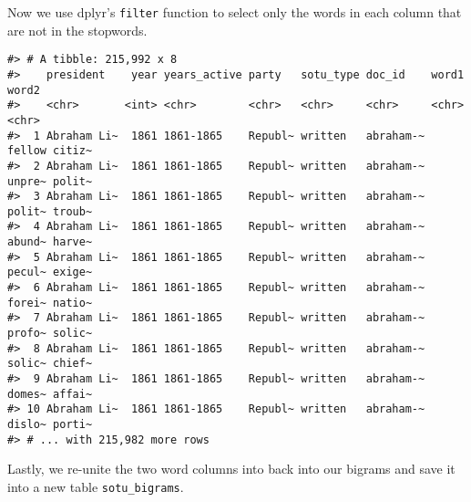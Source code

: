 \documentclass[]{book}
\newenvironment{Shaded}{\begin{snugshade}}{\end{snugshade}}
\newcommand{\CommentTok}[1]{\textcolor[rgb]{0.56,0.35,0.01}{\textit{#1}}}
\newcommand{\DataTypeTok}[1]{\textcolor[rgb]{0.13,0.29,0.53}{#1}}
\newcommand{\DecValTok}[1]{\textcolor[rgb]{0.00,0.00,0.81}{#1}}
\newcommand{\KeywordTok}[1]{\textcolor[rgb]{0.13,0.29,0.53}{\textbf{#1}}}
\newcommand{\NormalTok}[1]{#1}
\newcommand{\OperatorTok}[1]{\textcolor[rgb]{0.81,0.36,0.00}{\textbf{#1}}}
\newcommand{\StringTok}[1]{\textcolor[rgb]{0.31,0.60,0.02}{#1}}
\begin{document}
Now we use dplyr's \texttt{filter} function to select only the words in each column that are not in the stopwords.

\begin{Shaded}
\end{Shaded}

\begin{verbatim}
#> # A tibble: 215,992 x 8
#>    president    year years_active party   sotu_type doc_id    word1  word2 
#>    <chr>       <int> <chr>        <chr>   <chr>     <chr>     <chr>  <chr> 
#>  1 Abraham Li~  1861 1861-1865    Republ~ written   abraham-~ fellow citiz~
#>  2 Abraham Li~  1861 1861-1865    Republ~ written   abraham-~ unpre~ polit~
#>  3 Abraham Li~  1861 1861-1865    Republ~ written   abraham-~ polit~ troub~
#>  4 Abraham Li~  1861 1861-1865    Republ~ written   abraham-~ abund~ harve~
#>  5 Abraham Li~  1861 1861-1865    Republ~ written   abraham-~ pecul~ exige~
#>  6 Abraham Li~  1861 1861-1865    Republ~ written   abraham-~ forei~ natio~
#>  7 Abraham Li~  1861 1861-1865    Republ~ written   abraham-~ profo~ solic~
#>  8 Abraham Li~  1861 1861-1865    Republ~ written   abraham-~ solic~ chief~
#>  9 Abraham Li~  1861 1861-1865    Republ~ written   abraham-~ domes~ affai~
#> 10 Abraham Li~  1861 1861-1865    Republ~ written   abraham-~ dislo~ porti~
#> # ... with 215,982 more rows
\end{verbatim}

Lastly, we re-unite the two word columns into back into our bigrams and save it into a new table \texttt{sotu\_bigrams}.
\end{document}
